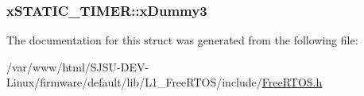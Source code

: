 \subsubsection[{\texorpdfstring{x\+Dummy3}{xDummy3}}]{ x\+S\+T\+A\+T\+I\+C\+\_\+\+T\+I\+M\+E\+R\+::x\+Dummy3}\hypertarget{structxSTATIC__TIMER_a60d582d1d0b5b9b15e8050d5ae29bc30}{}\label{structxSTATIC__TIMER_a60d582d1d0b5b9b15e8050d5ae29bc30}


The documentation for this struct was generated from the following file\+:\begin{DoxyCompactItemize}
\item 
/var/www/html/\+S\+J\+S\+U-\/\+D\+E\+V-\/\+Linux/firmware/default/lib/\+L1\+\_\+\+Free\+R\+T\+O\+S/include/\hyperlink{FreeRTOS_8h}{Free\+R\+T\+O\+S.\+h}\end{DoxyCompactItemize}
